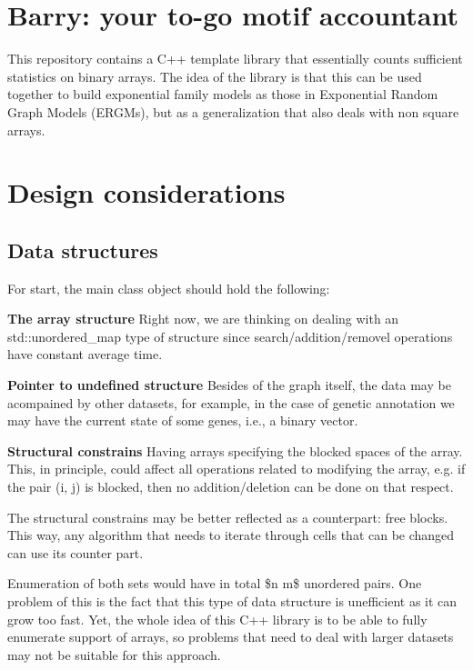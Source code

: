 \href{https://travis-ci.com/USCbiostats/barry}{\tt }

\section*{Barry\+: your to-\/go motif accountant}

This repository contains a C++ template library that essentially counts sufficient statistics on binary arrays. The idea of the library is that this can be used together to build exponential family models as those in Exponential Random Graph Models (E\+R\+G\+Ms), but as a generalization that also deals with non square arrays.

\section*{Design considerations}

\subsection*{Data structures}

For start, the main class object should hold the following\+:


\begin{DoxyItemize}
\item {\bfseries The array structure} Right now, we are thinking on dealing with an {\ttfamily std\+::unordered\+\_\+map} type of structure since search/addition/removel operations have constant average time.
\item {\bfseries Pointer to undefined structure} Besides of the graph itself, the data may be acompained by other datasets, for example, in the case of genetic annotation we may have the current state of some genes, i.\+e., a binary vector.
\item {\bfseries Structural constrains} Having arrays specifying the blocked spaces of the array. This, in principle, could affect all operations related to modifying the array, e.\+g. if the pair {\ttfamily (i, j)} is blocked, then no addition/deletion can be done on that respect.

The structural constrains may be better reflected as a counterpart\+: free blocks. This way, any algorithm that needs to iterate through cells that can be changed can use its counter part.

Enumeration of both sets would have in total \$n  m\$ unordered pairs. One problem of this is the fact that this type of data structure is unefficient as it can grow too fast. Yet, the whole idea of this C++ library is to be able to fully enumerate support of arrays, so problems that need to deal with larger datasets may not be suitable for this approach.
\end{DoxyItemize}

